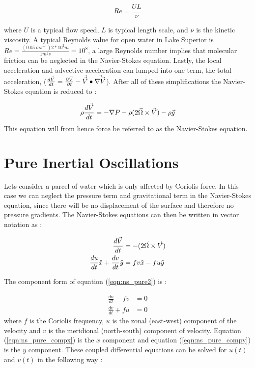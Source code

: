  \begin{equation}
  	Re = \frac{UL}{\nu}
  \end{equation}
 
where $U$ is a typical flow speed, $L$ is typical length scale, and $\nu$ is the kinetic viscosity. A typical Reynolds value for open water in Lake Superior is 
$Re=\frac{(0.05\ ms^{-1})2*10^2 m }{1 m^2s} = 10^8$, a large Reynolds number implies that molecular friction can be neglected in the Navier-Stokes equation.
Lastly, the local acceleration and advective acceleration can lumped into one term, the total acceleration,  ($\frac{d \vec{V}}{dt}=\frac{\partial \vec{V}}{\partial t}-\vec{\vec{V}} \bullet \vec{\nabla \vec{V}}$).
After all of these simplifications the Navier-Stokes equation is reduced to : 

 \begin{equation}   \rho \frac{d \vec{V}}{dt}= -\nabla P  -\rho(2\vec{\Omega} \times \vec{V}) - \rho\vec{g}    \end{equation}  \label{eqn:ns}
This equation will from hence force be referred to as the Navier-Stokes equation. 


\section{Pure Inertial Oscillations}
Lets consider a parcel of water which is only affected by Coriolis force. In this case we can neglect the pressure term and gravitational term in the Navier-Stokes equation, 
since there will be no displacement of the surface and therefore no pressure gradients. The Navier-Stokes equations can then be written in vector notation as : 

\begin{align}
	\frac{d \vec{V}}{dt} &=  -(2\vec{\Omega} \times \vec{V})  \label{eqn:ns_pure1}\\  
	\frac{d u}{dt}\hat{x} + \frac{d v}{dt} \hat{y} &=  fv\hat{x} - fu \hat{y}  \label{eqn:ns_pure2}
\end{align}

The component form of equation (\ref{eqn:ns_pure2}) is  : 

\begin{align}
	\frac{du}{dt}-fv&=0   \label{eqn:ns_pure_compx}\\
	\frac{dv}{dt}+fu&=0  \label{eqn:ns_pure_compy}
\end{align}
where $f$ is the Coriolis frequency, $u$ is the zonal (east-west) component of the velocity and $v$ is the meridional (north-south) component of
velocity. Equation (\ref{eqn:ns_pure_compx}) is the $x$ component and equation (\ref{eqn:ns_pure_compy}) is the $y$ component. 
These coupled differential equations can be solved for $u(t)$ and $v(t)$ in the following way : 

